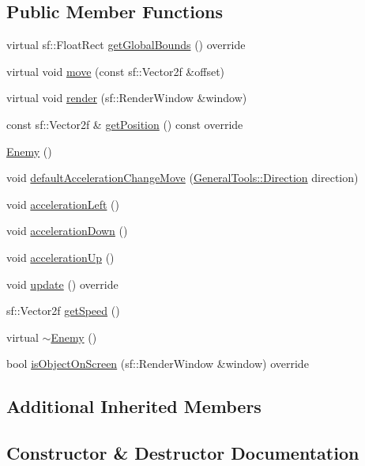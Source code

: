 \subsection*{Public Member Functions}
\begin{DoxyCompactItemize}
\item 
virtual sf\+::\+Float\+Rect \hyperlink{class_enemy_abb50439b9517d5a2b4c6b6c6a4e91672}{get\+Global\+Bounds} () override
\item 
virtual void \hyperlink{class_enemy_a4db256c45aa8d835561e035969883069}{move} (const sf\+::\+Vector2f \&offset)
\item 
virtual void \hyperlink{class_enemy_a409d7d48e2f6bb27f878691f14a79957}{render} (sf\+::\+Render\+Window \&window)
\item 
const sf\+::\+Vector2f \& \hyperlink{class_enemy_ade0ec5d0a52a35a387a4cdcccf4c9ddc}{get\+Position} () const override
\item 
\hyperlink{class_enemy_a94f30d348b6d2840fd71675472ba38dd}{Enemy} ()
\item 
void \hyperlink{class_enemy_ae642ab230b9b416142cfe2a6ed3e3aeb}{default\+Acceleration\+Change\+Move} (\hyperlink{namespace_general_tools_afedc3bd242369903830dec92c3ad569b}{General\+Tools\+::\+Direction} direction)
\item 
void \hyperlink{class_enemy_a842ae08ff3a191b3bfd5a0f865b968be}{acceleration\+Left} ()
\item 
void \hyperlink{class_enemy_a901af192d36d757b0cfbd2c92c742ccc}{acceleration\+Down} ()
\item 
void \hyperlink{class_enemy_acb3226b1c27efc097b3817a8efde1e93}{acceleration\+Up} ()
\item 
void \hyperlink{class_enemy_aa70d742da02995011f1618acc9e303db}{update} () override
\item 
sf\+::\+Vector2f \hyperlink{class_enemy_a8c53ca8541fdfc43b8464feeabefc150}{get\+Speed} ()
\item 
virtual \hyperlink{class_enemy_ac0eec4755e28c02688065f9657150ac3}{$\sim$\+Enemy} ()
\item 
bool \hyperlink{class_enemy_a9a6b7416616b3d0464978d38cf7095e9}{is\+Object\+On\+Screen} (sf\+::\+Render\+Window \&window) override
\end{DoxyCompactItemize}
\subsection*{Additional Inherited Members}


\subsection{Constructor \& Destructor Documentation}
\hypertarget{class_enemy_a94f30d348b6d2840fd71675472ba38dd}{}
